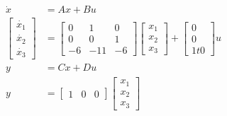 \documentclass[../main.tex]{subfiles}
\begin{document}
                \begin{equation}
                    \begin{split}
                        \dot{x} &= Ax +Bu \\[5pt]
                        \begin{bmatrix} \dot{x_1} \\ \dot{x_2} \\ \dot{x_3} \end{bmatrix} &= \begin{bmatrix} 0 & 1 & 0 \\ 0 & 0 & 1 \\ -6 & -11 & -6 \end{bmatrix} \begin{bmatrix} x_1 \\ x_2 \\ x_3 \end{bmatrix} + \begin{bmatrix} 0 \\ 0 \\ 1t0 \end{bmatrix} u \\[10pt]
                        y &= Cx + Du \\[5pt]
                        y &= \begin{bmatrix} 1 & 0 & 0 \end{bmatrix} \begin{bmatrix} x_1 \\ x_2 \\ x_3 \end{bmatrix}
                        \label{persamaan_4}
                    \end{split}
                \end{equation}
\end{document}
